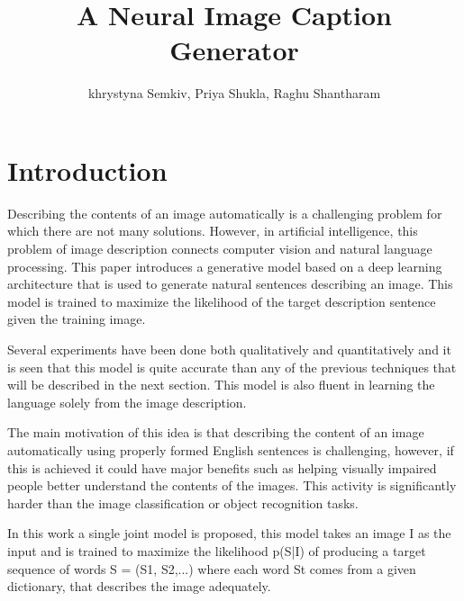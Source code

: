 \documentclass[a4paper,UKenglish,cleveref, autoref, thm-restate]{lipics-v2021}
\title{A Neural Image Caption Generator } %
\author{khrystyna Semkiv, Priya Shukla, Raghu Shantharam}{Ulm University, Germany}{kh.semkiv@uni-ulm.de, priya.shukla@gmail.com, raghu.mysore@uni-ulm.de}{}{}%
\begin{document}
\maketitle



\section{ Introduction}
\label{introduction}

Describing the contents of an image automatically is a challenging problem for which there are not many solutions. However, in artificial intelligence, this problem of image description connects computer vision and natural language processing. This paper introduces a generative model based on a deep learning architecture that is used to generate natural sentences describing an image.
This model is trained to maximize the likelihood of the target description sentence given the training image.

Several experiments have been done both qualitatively and quantitatively and it is seen that this model is quite accurate than any of the previous techniques that will be described in the next section. This model is also fluent in learning the language solely from the image description.

The main motivation of this idea is that describing the content of an image automatically using properly formed English sentences is challenging, however, if this is achieved it could have major benefits such as helping visually impaired people better understand the contents of the images.
This activity is significantly harder than the image classification or object recognition tasks.

In this work a single joint model is proposed, this model takes an image I as the input and is trained to maximize the likelihood p(S|I) of producing a target sequence of words S = (S1, S2,...) where each word St comes from a given dictionary, that describes the image adequately.
\end{document}
